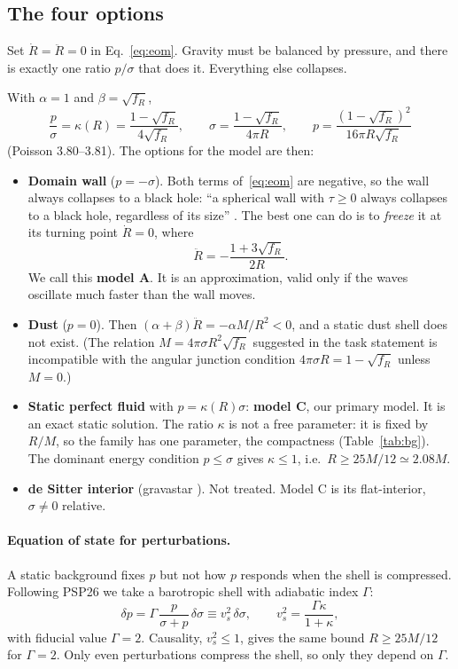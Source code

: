 \documentclass[11pt,a4paper]{article}
\numberwithin{equation}{section}
\newcommand{\sq}{\sqrt{f_R}}
\begin{document}
\subsection{The four options}
\begin{keyidea}
Set $\dot R=\ddot R=0$ in Eq.~\eqref{eq:eom}. Gravity must be balanced by pressure, and there is exactly one ratio
$p/\sigma$ that does it. Everything else collapses.
\end{keyidea}
With $\alpha=1$ and $\beta=\sq$,
\begin{equation}
\frac{p}{\sigma}=\kappa(R)=\frac{1-\sq}{4\sq},\qquad \sigma=\frac{1-\sq}{4\pi R},\qquad p=\frac{(1-\sq)^2}{16\pi R\sq}
\label{eq:kappa}
\end{equation}
(Poisson 3.80--3.81). The options for the model are then:
\begin{itemize}
\item \textbf{Domain wall} ($p=-\sigma$). Both terms of~\eqref{eq:eom} are negative, so the wall always collapses to a
black hole: ``a spherical wall with $\tau\ge0$ always collapses to a black hole, regardless of its size'' \cite{IS84}. The
best one can do is to \emph{freeze} it at its turning point $\dot R=0$, where
\begin{equation}
\ddot R=-\frac{1+3\sq}{2R}.
\label{eq:Rdd}
\end{equation}
We call this \textbf{model A}. It is an approximation, valid only if the waves oscillate much faster than the wall
moves.
\item \textbf{Dust} ($p=0$). Then $(\alpha+\beta)\ddot R=-\alpha M/R^2<0$, and a static dust shell does not exist. (The
relation $M=4\pi\sigma R^2\sq$ suggested in the task statement is incompatible with the angular junction condition
$4\pi\sigma R=1-\sq$ unless $M=0$.)
\item \textbf{Static perfect fluid} with $p=\kappa(R)\sigma$: \textbf{model C}, our primary model. It is an exact
static solution. The ratio $\kappa$ is not a free parameter: it is fixed by $R/M$, so the family has one parameter, the
compactness (Table~\ref{tab:bg}). The dominant energy condition $p\le\sigma$ gives $\kappa\le1$, i.e.\
$R\ge25M/12\simeq2.08M$.
\item \textbf{de Sitter interior} (gravastar \cite{Pani09}). Not treated. Model C is its flat-interior, $\sigma\ne0$
relative.
\end{itemize}

\paragraph{Equation of state for perturbations.} A static background fixes $p$ but not how $p$ responds when the shell
is compressed. Following PSP26 \cite{PSP26} we take a barotropic shell with adiabatic index $\Gamma$:
\begin{equation}
\delta p=\Gamma\,\frac{p}{\sigma+p}\,\delta\sigma\equiv v_s^2\,\delta\sigma,\qquad v_s^2=\frac{\Gamma\kappa}{1+\kappa},
\label{eq:eos}
\end{equation}
with fiducial value $\Gamma=2$. Causality, $v_s^2\le1$, gives the same bound $R\ge25M/12$ for $\Gamma=2$. Only even
perturbations compress the shell, so only they depend on $\Gamma$.
\end{document}
